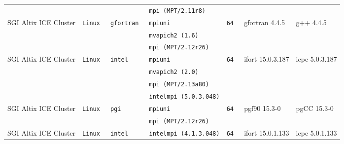 \begin{longtable}{lllllll}
                      &           &                 &\tt mpi (MPT/2.11r8) &                 &                                     &                                 \\
SGI Altix ICE Cluster &\tt Linux  &\tt gfortran     &\tt mpiuni           &\tt 64           & gfortran \footnotesize 4.4.5        & g++ \footnotesize 4.4.5         \\ %
                      &           &                 &\tt mvapich2 (1.6)   &                 &                                     &                                 \\
                      &           &                 &\tt mpi (MPT/2.12r26)&                 &                                     &                                 \\
SGI Altix ICE Cluster &\tt Linux  &\tt intel        &\tt mpiuni           &\tt 64           & ifort \footnotesize 15.0.3.187      & icpc \footnotesize 5.0.3.187    \\ %
                      &           &                 &\tt mvapich2 (2.0)   &                 &                                     &                                 \\
                      &           &                 &\tt mpi (MPT/2.13a80)&                 &                                     &                                 \\
                      &           &                 &\tt intelmpi (5.0.3.048)&              &                                     &                                 \\
SGI Altix ICE Cluster &\tt Linux  &\tt pgi          &\tt mpiuni           &\tt 64           & pgf90 \footnotesize 15.3-0          & pgCC \footnotesize 15.3-0       \\ %
                      &           &                 &\tt mpi (MPT/2.12r26)&                 &                                     &                                 \\
SGI Altix ICE Cluster &\tt Linux  &\tt intel        &\tt intelmpi (4.1.3.048)&\tt 64        & ifort \footnotesize 15.0.1.133      & icpc \footnotesize 5.0.1.133    \\ %

\end{longtable}
